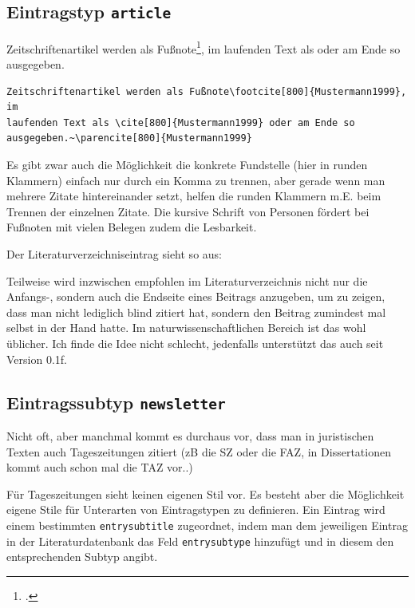 

\subsection{Eintragstyp \texttt{article}}


Zeitschriftenartikel werden als Fußnote\footcite[800]{Mustermann1999}, im laufenden Text als
\cite[800]{Mustermann1999} oder am Ende so ausgegeben.~\parencite[800]{Mustermann1999}

\begin{lstlisting}[frame=single,xleftmargin=\fboxsep,xrightmargin=\fboxsep]
Zeitschriftenartikel werden als Fußnote\footcite[800]{Mustermann1999}, im 
laufenden Text als \cite[800]{Mustermann1999} oder am Ende so 
ausgegeben.~\parencite[800]{Mustermann1999}
\end{lstlisting}
 
Es gibt zwar auch die Möglichkeit die konkrete Fundstelle (hier in runden Klammern) einfach nur 
durch ein Komma zu trennen, aber gerade wenn man mehrere Zitate hintereinander setzt, helfen die 
runden Klammern m.E. beim Trennen der einzelnen Zitate. Die kursive Schrift von Personen fördert 
bei Fußnoten mit vielen Belegen zudem die Lesbarkeit.

Der Literaturverzeichniseintrag sieht so aus:

{}

Teilweise wird inzwischen empfohlen im Literaturverzeichnis nicht nur die Anfangs-, sondern auch 
die Endseite eines Beitrags anzugeben, um zu zeigen, dass man nicht lediglich blind zitiert hat, 
sondern den Beitrag zumindest mal selbst in der Hand hatte. Im naturwissenschaftlichen Bereich ist 
das wohl üblicher. Ich finde die Idee nicht schlecht, jedenfalls unterstützt \bibj das auch seit Version 
0.1f.


\subsection{Eintragssubtyp \texttt{newsletter}}


Nicht oft, aber manchmal kommt es durchaus vor, dass man in juristischen Texten auch 
Tageszeitungen zitiert (zB die SZ oder die FAZ, in Dissertationen kommt auch schon mal die TAZ vor..)

Für Tageszeitungen sieht \bib keinen eigenen Stil vor. Es besteht aber die Möglichkeit eigene Stile für 
Unterarten von Eintragstypen zu definieren. Ein Eintrag wird einem bestimmten \texttt{entrysubtitle} 
zugeordnet, indem man dem jeweiligen Eintrag in der Literaturdatenbank das Feld 
\texttt{entrysubtype} 
hinzufügt und in diesem den entsprechenden Subtyp angibt.

